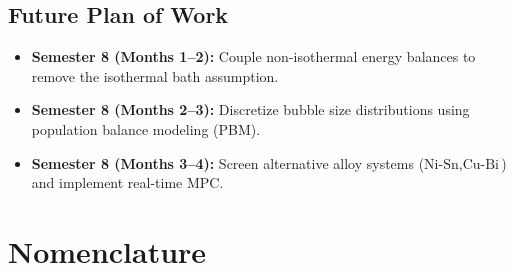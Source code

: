 \documentclass[12pt,a4paper,oneside]{report}
\begin{document}
\section{Future Plan of Work}
\begin{itemize}
    \item \textbf{Semester 8 (Months 1–2):} Couple non-isothermal energy balances to remove the isothermal bath assumption.
    \item \textbf{Semester 8 (Months 2–3):} Discretize bubble size distributions using population balance modeling (PBM).
    \item \textbf{Semester 8 (Months 3–4):} Screen alternative alloy systems ($\text{Ni-Sn}, \text{Cu-Bi}$) and implement real-time MPC.
\end{itemize}

\chapter{Nomenclature}
\end{document}
